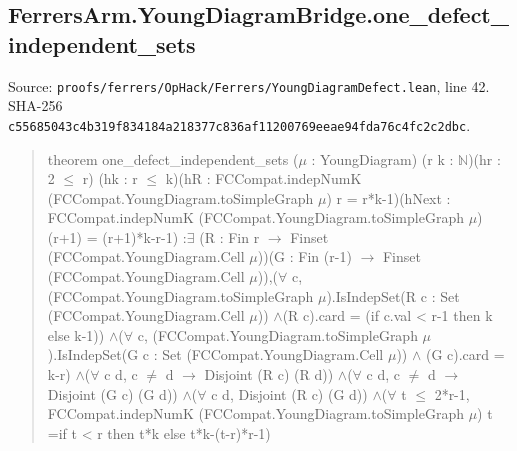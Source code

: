 \documentclass[11pt,a4paper]{article}
\begin{document}
\subsection{FerrersArm.YoungDiagramBridge.one\_defect\_independent\_sets}
Source: \texttt{proofs/ferrers/OpHack/Ferrers/YoungDiagramDefect.lean}, line 42. SHA-256 \texttt{c55685043c4b319f834184a218377c836af11200769eeae94fda76c4fc2c2dbc}.

\begin{quote}\small\ttfamily theorem one\_defect\_independent\_sets (\ensuremath{\mu} : YoungDiagram) (r k : \ensuremath{\mathbb{N}})\newline (hr : 2 \ensuremath{\leq} r) (hk : r \ensuremath{\leq} k)\newline (hR : FCCompat.indepNumK (FCCompat.YoungDiagram.toSimpleGraph \ensuremath{\mu}) r = r*k-1)\newline (hNext : FCCompat.indepNumK (FCCompat.YoungDiagram.toSimpleGraph \ensuremath{\mu})\newline (r+1) = (r+1)*k-r-1) :\newline \ensuremath{\exists} (R : Fin r \ensuremath{\to} Finset (FCCompat.YoungDiagram.Cell \ensuremath{\mu}))\newline (G : Fin (r-1) \ensuremath{\to} Finset (FCCompat.YoungDiagram.Cell \ensuremath{\mu})),\newline (\ensuremath{\forall} c, (FCCompat.YoungDiagram.toSimpleGraph \ensuremath{\mu}).IsIndepSet\newline (R c : Set (FCCompat.YoungDiagram.Cell \ensuremath{\mu})) \ensuremath{\wedge}\newline (R c).card = (if c.val < r-1 then k else k-1)) \ensuremath{\wedge}\newline (\ensuremath{\forall} c, (FCCompat.YoungDiagram.toSimpleGraph \ensuremath{\mu}).IsIndepSet\newline (G c : Set (FCCompat.YoungDiagram.Cell \ensuremath{\mu})) \ensuremath{\wedge} (G c).card = k-r) \ensuremath{\wedge}\newline (\ensuremath{\forall} c d, c \ensuremath{\neq} d \ensuremath{\to} Disjoint (R c) (R d)) \ensuremath{\wedge}\newline (\ensuremath{\forall} c d, c \ensuremath{\neq} d \ensuremath{\to} Disjoint (G c) (G d)) \ensuremath{\wedge}\newline (\ensuremath{\forall} c d, Disjoint (R c) (G d)) \ensuremath{\wedge}\newline (\ensuremath{\forall} t \ensuremath{\leq} 2*r-1, FCCompat.indepNumK (FCCompat.YoungDiagram.toSimpleGraph \ensuremath{\mu}) t =\newline if t < r then t*k else t*k-(t-r)*r-1)\end{quote}
\end{document}
